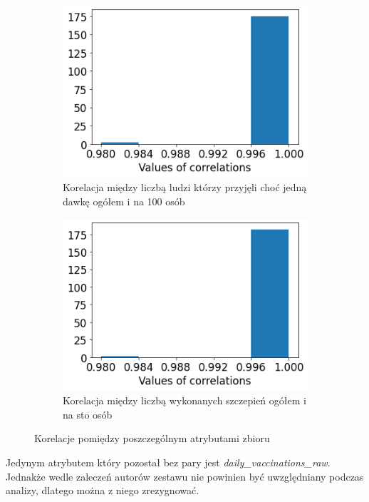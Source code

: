 \documentclass[12pt, oneside]{article}
\begin{document}
\begin{figure}[!ht]
  \begin{subfigure}[t]{.45\textwidth}
    \centering
    \includegraphics[width=\linewidth]{../img/null_column_diff3.png}
    \caption{Korelacja między liczbą ludzi którzy przyjęli choć jedną dawkę ogółem i na 100 osób}
  \end{subfigure}
  \hfill
  \begin{subfigure}[t]{.45\textwidth}
    \centering
    \includegraphics[width=\linewidth]{../img/null_column_diff4.png}
    \caption{Korelacja między liczbą wykonanych szczepień ogółem i na sto osób}
  \end{subfigure}
  \caption{Korelacje pomiędzy poszczególnym atrybutami zbioru}
\label{Rys:histOfCorrAttr}
\end{figure}


Jedynym atrybutem który pozostał bez pary jest \textit{daily\_vaccinations\_raw}. Jednakże wedle zaleczeń autorów zestawu nie powinien być uwzględniany podczas analizy, dlatego można z niego zrezygnować. 
\end{document}
